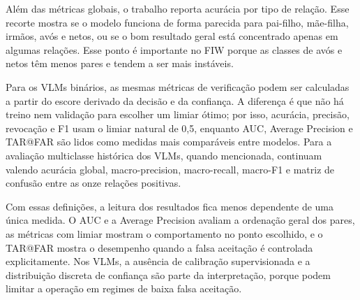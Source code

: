 Além das métricas globais, o trabalho reporta acurácia por tipo de relação. Esse recorte mostra se o modelo funciona de forma parecida para pai-filho, mãe-filha, irmãos, avós e netos, ou se o bom resultado geral está concentrado apenas em algumas relações. Esse ponto é importante no FIW porque as classes de avós e netos têm menos pares e tendem a ser mais instáveis.

Para os VLMs binários, as mesmas métricas de verificação podem ser calculadas a partir do escore derivado da decisão e da confiança. A diferença é que não há treino nem validação para escolher um limiar ótimo; por isso, acurácia, precisão, revocação e F1 usam o limiar natural de 0,5, enquanto AUC, Average Precision e TAR@FAR são lidos como medidas mais comparáveis entre modelos. Para a avaliação multiclasse histórica dos VLMs, quando mencionada, continuam valendo acurácia global, macro-precision, macro-recall, macro-F1 e matriz de confusão entre as onze relações positivas.

Com essas definições, a leitura dos resultados fica menos dependente de uma única medida. O AUC e a Average Precision avaliam a ordenação geral dos pares, as métricas com limiar mostram o comportamento no ponto escolhido, e o TAR@FAR mostra o desempenho quando a falsa aceitação é controlada explicitamente. Nos VLMs, a ausência de calibração supervisionada e a distribuição discreta de confiança são parte da interpretação, porque podem limitar a operação em regimes de baixa falsa aceitação.
